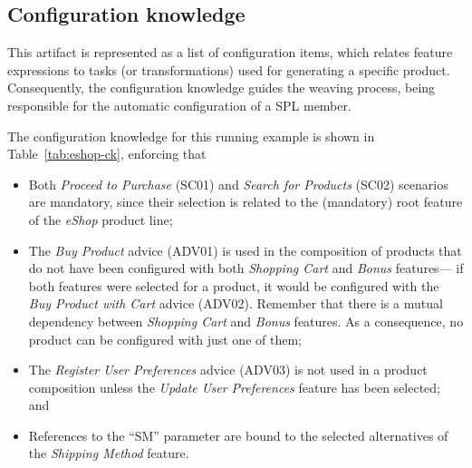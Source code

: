 \documentclass{acm_proc_article-sp}
\begin{document}
\subsection{Configuration knowledge}\label{sub:configuration-knowledge}

{\color{red} This artifact is represented as a list of configuration items, which relates
feature expressions to tasks (or transformations) used for generating a specific product. Consequently, the configuration knowledge guides the weaving process, being responsible for the automatic configuration of a SPL member. }

The configuration knowledge for this running example is shown in Table~\ref{tab:eshop-ck}, enforcing that

\begin{itemize}
\item Both \emph{Proceed to Purchase} (SC01) and \emph{Search for Products}
(SC02) scenarios are mandatory, since their selection is related to the
(mandatory) root feature of the \emph{eShop} product line;

\item The \emph{Buy Product} advice (ADV01) is used in the composition of
products that do not have been configured with both \emph{Shopping Cart} and \emph{Bonus}
features--- if both features were selected for a product, it would be configured
with the \emph{Buy Product with Cart} advice (ADV02). Remember that there is a
mutual dependency between \emph{Shopping Cart} and \emph{Bonus} features. As a
consequence, no product can be configured with just one of them;

\item The \emph{Register User Preferences} advice (ADV03) is not used in a
product composition unless the \emph{Update User Preferences} feature has been
selected; and

\item References to the ``SM'' parameter are bound to the
selected alternatives of the \emph{Shipping Method} feature.

\end{itemize}
\end{document}
